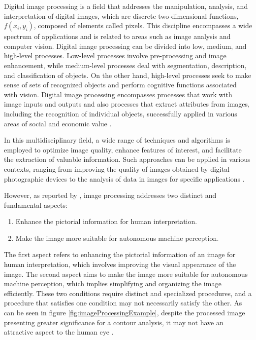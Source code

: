 Digital image processing is a field that addresses the manipulation, analysis, and interpretation of digital images, which are discrete two-dimensional functions, $f(x_i, y_i)$, composed of elements called pixels. This discipline encompasses a wide spectrum of applications and is related to areas such as image analysis and computer vision. Digital image processing can be divided into low, medium, and high-level processes. Low-level processes involve pre-processing and image enhancement, while medium-level processes deal with segmentation, description, and classification of objects. On the other hand, high-level processes seek to make sense of sets of recognized objects and perform cognitive functions associated with vision. Digital image processing encompasses processes that work with image inputs and outputs and also processes that extract attributes from images, including the recognition of individual objects, successfully applied in various areas of social and economic value \cite{gonzalez_rafael_c_digital_2018}.

In this multidisciplinary field, a wide range of techniques and algorithms is employed to optimize image quality, enhance features of interest, and facilitate the extraction of valuable information. Such approaches can be applied in various contexts, ranging from improving the quality of images obtained by digital photographic devices to the analysis of data in images for specific applications \cite{ekstrom2012}.

However, as reported by \textcite{mcandrew2004introduction}, image processing addresses two distinct and fundamental aspects:
\begin{enumerate}
\item Enhance the pictorial information for human interpretation.
\item Make the image more suitable for autonomous machine perception.
\end{enumerate}

The first aspect refers to enhancing the pictorial information of an image for human interpretation, which involves improving the visual appearance of the image. The second aspect aims to make the image more suitable for autonomous machine perception, which implies simplifying and organizing the image efficiently. These two conditions require distinct and specialized procedures, and a procedure that satisfies one condition may not necessarily satisfy the other. As can be seen in figure \ref{fig:imageProcessingExample}, despite the processed image presenting greater significance for a contour analysis, it may not have an attractive aspect to the human eye \cite{mcandrew2004introduction}.



